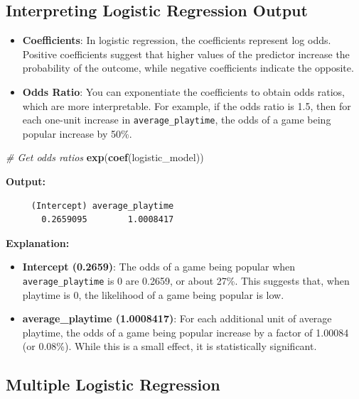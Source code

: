 \documentclass[
]{book}
\newenvironment{Shaded}{\begin{snugshade}}{\end{snugshade}}
\newcommand{\CommentTok}[1]{\textcolor[rgb]{0.56,0.35,0.01}{\textit{#1}}}
\newcommand{\FunctionTok}[1]{\textcolor[rgb]{0.13,0.29,0.53}{\textbf{#1}}}
\newcommand{\NormalTok}[1]{#1}
\providecommand{\tightlist}{%
  \setlength{\itemsep}{0pt}\setlength{\parskip}{0pt}}
\begin{document}
\subsection*{Interpreting Logistic Regression Output}\label{interpreting-logistic-regression-output}

\begin{itemize}
\tightlist
\item
  \textbf{Coefficients}: In logistic regression, the coefficients represent log odds. Positive coefficients suggest that higher values of the predictor increase the probability of the outcome, while negative coefficients indicate the opposite.
\item
  \textbf{Odds Ratio}: You can exponentiate the coefficients to obtain odds ratios, which are more interpretable. For example, if the odds ratio is 1.5, then for each one-unit increase in \texttt{average\_playtime}, the odds of a game being popular increase by 50\%.
\end{itemize}

\begin{Shaded}
\begin{Highlighting}[]
\CommentTok{\# Get odds ratios}
\FunctionTok{exp}\NormalTok{(}\FunctionTok{coef}\NormalTok{(logistic\_model))}
\end{Highlighting}
\end{Shaded}

\textbf{Output:}

\begin{verbatim}
     (Intercept) average_playtime 
       0.2659095        1.0008417 
\end{verbatim}

\textbf{Explanation:}

\begin{itemize}
\tightlist
\item
  \textbf{Intercept (0.2659)}: The odds of a game being popular when \texttt{average\_playtime} is 0 are 0.2659, or about 27\%. This suggests that, when playtime is 0, the likelihood of a game being popular is low.
\item
  \textbf{average\_playtime (1.0008417)}: For each additional unit of average playtime, the odds of a game being popular increase by a factor of 1.00084 (or 0.08\%). While this is a small effect, it is statistically significant.
\end{itemize}

\subsection*{Multiple Logistic Regression}\label{multiple-logistic-regression}
\end{document}
